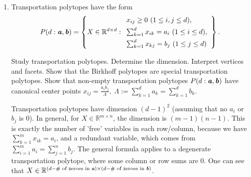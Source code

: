\documentclass{article}
\begin{document}
\begin{enumerate}
\begin{solution}
We state the following
\begin{theorem*}
Let $V \in \mathbb{R}^{d \times n}$, $Y \in \mathbb{R}^{d \times n'}$, $\bi{x} \in \mathbb{R}^d$. If $\bi{x} \in \conv(V) \boxplus \cone(Y)$, then $\bi{x} \in \conv(V') \boxplus \cone(Y')$ holds for subsets $V' \subseteq V$, $Y' \subseteq Y$ of at most $\dim\conv(V)$, $\dim\cone(Y) + 1$ vectors in $V$, $Y$, respectively.
\end{theorem*}
\begin{proof}
We have the biconditional:
\[\bi{x} \in \conv(V) \boxplus \cone(Y) \iff \bi{v} \in \conv(V), \bi{y} \in \conv(Y), \bi{v} \boxplus \bi{y} = \bi{x}\]
Now notice:
\[\bi{x} \in \conv(V) \iff \begin{pmatrix}
    1 \\ \bi{x}
\end{pmatrix} \in \cone\begin{pmatrix}
    \mathds{1} \\ V
\end{pmatrix}\]
Thus, the theorem follows by standard Carathéodory.
\end{proof}
\end{solution}

\item Transportation polytopes have the form
\[
P(d : \textbf{\textit{a}}, \textbf{\textit{b}})
=\left\{
X\in\mathbb{R}^{d\times d} :
\begin{array}{l}
x_{ij}\ge 0 \ (1\le i,j\le d),\\[4pt]
\sum_{k=1}^d x_{ik}=a_i \ (1\le i\le d),\\[4pt]
\sum_{k=1}^d x_{kj}=b_j \ (1\le j\le d)
\end{array}
\right\}.
\]

Study transportation polytopes. Determine the dimension. Interpret vertices and facets. Show that the Birkhoff polytopes are special transportation polytopes. Show that non-empty transportation polytopes $P(d : \textbf{\textit{a}}, \textbf{\textit{b}})$ have canonical center points $x_{ij}=\frac{a_i b_j}{\Lambda},\; \Lambda := \sum_{k=1}^d a_k = \sum_{k=1}^d b_k.$

\begin{solution}
Transportation polytopes have dimension $(d-1)^2$ (assuming that no $a_i$ or $b_j$ is $0$). In general, for $X \in \mathbb{R}^{m\times n}$, the dimension is $(m-1)(n-1)$. This is exactly the number of 'free' variables in each row/column, because we have $\sum_{k=1}^m x_{ik}=a_i$, and a redundant variable, which comes from $\sum_{i=1}^m a_i = \sum_{j=1}^n b_j$. The general formula applies to a degenerate transportation polytope, where some column or row sums are $0$. One can see that $X \in \mathbb{R}^{(d - \textup{\# of zeroes in } \textbf{\textit{a}}) \times (d - \textup{\# of zeroes in } \textbf{\textit{b}})}$.


\end{solution}
\end{enumerate}
\end{document}
